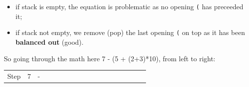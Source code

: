 \documentclass[
  letterpaper,
]{scrbook}
\newcounter{none} %
\providecommand{\tightlist}{%
  \setlength{\itemsep}{0pt}\setlength{\parskip}{0pt}}
\begin{document}
\begin{itemize}
\tightlist
\item
  if stack is empty, the equation is problematic as no opening
  \texttt{(} has preceeded it;
\item
  if stack not empty, we remove (pop) the last opening \texttt{(} on top
  as it has been \textbf{balanced out} (good).
\end{itemize}

So going through the math here 7 - (5 + (2+3)*10), from left to right:

{\def\LTcaptype{none} %
\begin{longtable}[]{@{}
  >{\raggedright\arraybackslash}p{}
  >{\raggedright\arraybackslash}p{}
  >{\raggedright\arraybackslash}p{}
  >{\raggedright\arraybackslash}p{}
  >{\raggedright\arraybackslash}p{}
  >{\raggedright\arraybackslash}p{}
  >{\raggedright\arraybackslash}p{}
  >{\raggedright\arraybackslash}p{}
  >{\raggedright\arraybackslash}p{}
  >{\raggedright\arraybackslash}p{}
  >{\raggedright\arraybackslash}p{}
  >{\raggedright\arraybackslash}p{}
  >{\raggedright\arraybackslash}p{}
  >{\raggedright\arraybackslash}p{}
  >{\raggedright\arraybackslash}p{}
  >{\raggedright\arraybackslash}p{}
  >{\raggedright\arraybackslash}p{}
  >{\raggedright\arraybackslash}p{}@{}}
\toprule\noalign{}
\begin{minipage}[b]{\linewidth}\raggedright
Step
\end{minipage} & \begin{minipage}[b]{\linewidth}\raggedright
7
\end{minipage} & \begin{minipage}[b]{\linewidth}\raggedright
-
\end{minipage} & \begin{minipage}[b]{\linewidth}\raggedright

\end{minipage}
\end{longtable}}
\end{document}

